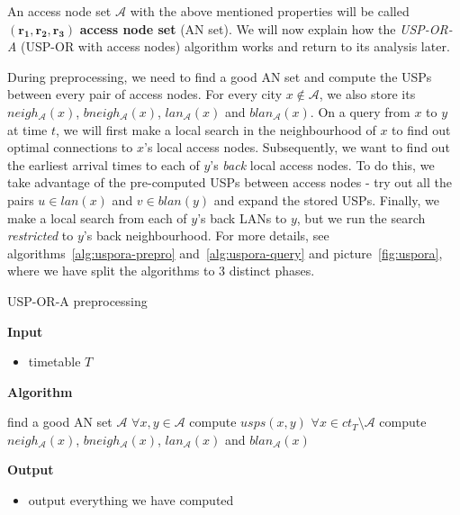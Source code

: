 	\noindent An access node set $\mathcal{A}$ with the above mentioned properties will be called $\bm{(r_{1}, r_{2}, r_{3})}$ \textbf{access node set} (AN set). We will now explain how the \textit{USP-OR-A} (USP-OR with access nodes) algorithm works and return to its analysis later. 
	
	During preprocessing, we need to find a good AN set and compute the USPs between every pair of access nodes. For every city $x \not \in \mathcal{A}$, we also store its $neigh_{\mathcal{A}}(x)$, $bneigh_{\mathcal{A}}(x)$, $lan_{\mathcal{A}}(x)$ and $blan_{\mathcal{A}}(x)$. On a query from $x$ to $y$ at time $t$, we will first make a local search in the neighbourhood of $x$ to find out optimal connections to $x$'s local access nodes. Subsequently, we want to find out the earliest arrival times to each of $y$'s \textit{back} local access nodes. To do this, we take advantage of the pre-computed USPs between access nodes - try out all the pairs $u \in lan(x)$ and $v \in blan(y)$ and expand the stored USPs. Finally, we make a local search from each of $y$'s back LANs to $y$, but we run the search \textit{restricted} to $y$'s back neighbourhood. For more details, see algorithms~\ref{alg:uspora-prepro} and~\ref{alg:uspora-query} and picture~\ref{fig:uspora}, where we have split the algorithms to 3 distinct phases.
	
	\color{algcolor}
	\begin{algorithm}[H]
		\color{inalgcolor}
		\caption{USP-OR-A preprocessing}
		\label{alg:uspora-prepro}
		\textbf{Input} 
		\begin{itemize}
			\item timetable $T$
		\end{itemize}
		\textbf{Algorithm}
		\begin{algorithmic}
			\STATE find a good AN set $\mathcal{A}$
			\STATE $\forall x, y \in \mathcal{A}$ compute $usps(x, y)$
			\STATE $\forall x \in ct_{T} \setminus \mathcal{A}$ compute $neigh_{\mathcal{A}}(x)$, $bneigh_{\mathcal{A}}(x)$, $lan_{\mathcal{A}}(x)$ and $blan_{\mathcal{A}}(x)$
		\end{algorithmic}
		\textbf{Output}
		\begin{itemize}
			\item output everything we have computed
		\end{itemize}
	\end{algorithm}
	\color{black}
	
